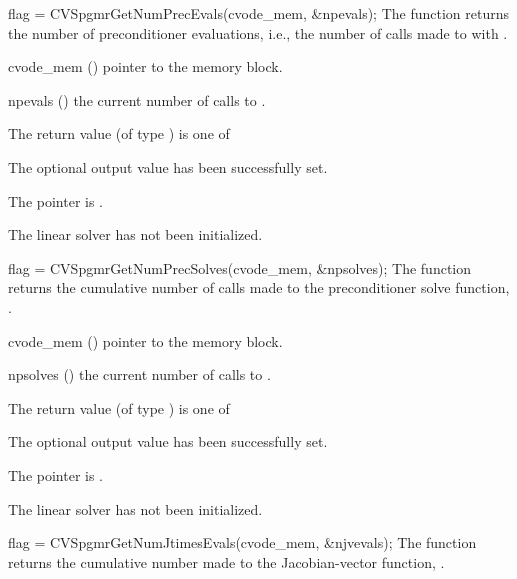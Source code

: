 {}
{
  flag = CVSpgmrGetNumPrecEvals(cvode\_mem, \&npevals);
}
{
  The function  returns the
  number of preconditioner evaluations, i.e., the number of 
  calls made to  with .
}
{
  \begin{args}
  \item[cvode\_mem] ()
    pointer to the {\cvode} memory block.
  \item[npevals] ()
    the current number of calls to .
  \end{args}
}
{
  The return value  (of type ) is one of
  \begin{args}
  \item[\Id{CVSPGMR\_SUCCESS}] 
    The optional output value has been successfully set.
  \item[\Id{CVSPGMR\_MEM\_NULL}]
    The  pointer is .
  \item[\Id{CVSPGMR\_LMEM\_NULL}]
    The {\cvspgmr} linear solver has not been initialized.
  \end{args}
}
{}
{
  flag = CVSpgmrGetNumPrecSolves(cvode\_mem, \&npsolves);
}
{
  The function  returns the
  cumulative number of calls made to the preconditioner 
  solve function, .
}
{
  \begin{args}
  \item[cvode\_mem] ()
    pointer to the {\cvode} memory block.
  \item[npsolves] ()
    the current number of calls to .
  \end{args}
}
{
  The return value  (of type ) is one of
  \begin{args}
  \item[\Id{CVSPGMR\_SUCCESS}] 
    The optional output value has been successfully set.
  \item[\Id{CVSPGMR\_MEM\_NULL}]
    The  pointer is .
  \item[\Id{CVSPGMR\_LMEM\_NULL}]
    The {\cvspgmr} linear solver has not been initialized.
  \end{args}
}
{}
{
  flag = CVSpgmrGetNumJtimesEvals(cvode\_mem, \&njvevals);
}
{
  The function  returns the
  cumulative number made to the Jacobian-vector function,
  .
}
